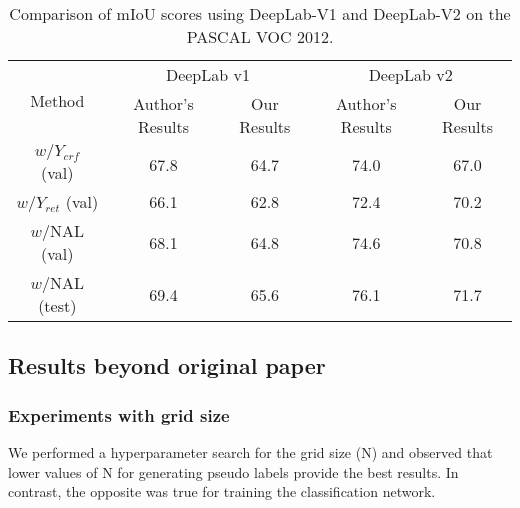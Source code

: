 \begin{table}[ht!]
\begin{center}
\begin{tabular}{ccccc}
\toprule\toprule
\multirow{2}{*}{Method} & \multicolumn{2}{c}{DeepLab v1} & \multicolumn{2}{c}{DeepLab v2} \\ %
                        & Author's Results & Our Results & Author's Results & Our Results \\ \midrule
$w / Y_{crf}$ \hspace{1mm} (val)                 & 67.8             & 64.7        & 74.0             & 67.0        \\ 
$w / Y_{ret}$ \hspace{1mm} (val)                  & 66.1             & 62.8        & 72.4             & 70.2        \\ 
$w /$NAL \hspace{1mm}(val)                  & 68.1             & 64.8        & 74.6             & 70.8        \\
$w /$NAL \hspace{1mm}(test)                  & 69.4             & 65.6        & 76.1             & 71.7        \\ \bottomrule
\end{tabular}
\vspace{1mm}
\caption{Comparison of mIoU scores using DeepLab-V1 and DeepLab-V2 on the PASCAL VOC 2012.}
\label{tab:Table 5}
\end{center}
\end{table}

\subsection{Results beyond original paper}

\subsubsection{Experiments with grid size}
\label{sec:grid}

We performed a hyperparameter search for the grid size (N) and observed that lower values of N for generating pseudo labels provide the best results. In contrast, the opposite was true for training the classification network. 

